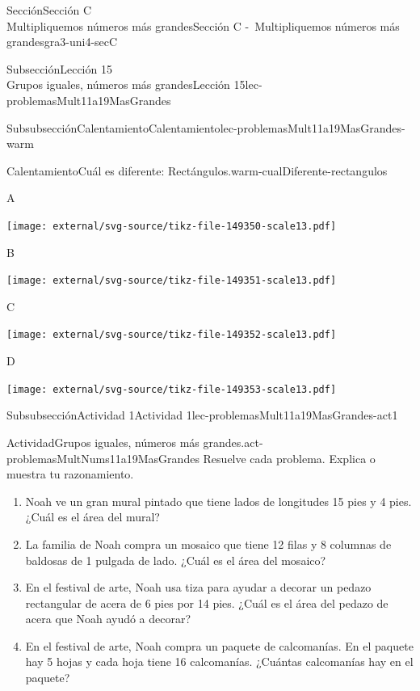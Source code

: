 \begin{sectionptx}{Sección}{{\Large Sección C\\}Multipliquemos números más grandes}{}{Sección C -~Multipliquemos números más grandes}{}{}{gra3-uni4-secC}
\begin{subsectionptx}{Subsección}{{\normalsize Lección 15\\[-0.05cm]}Grupos iguales, números más grandes}{}{Lección 15}{}{}{lec-problemasMult11a19MasGrandes}
\begin{subsubsectionptx}{Subsubsección}{Calentamiento}{}{Calentamiento}{}{}{lec-problemasMult11a19MasGrandes-warm}
\begin{exploration}{Calentamiento}{Cuál es diferente: Rectángulos.}{warm-cualDiferente-rectangulos}
\begin{sidebyside}{2}{0}{0}{0}
\begin{sbspanel}{0.5}
A%
\par
\texttt{[image: external/svg-source/tikz-file-149350-scale13.pdf]}
\end{sbspanel}%
\begin{sbspanel}{0.5}%
B%
\par
\texttt{[image: external/svg-source/tikz-file-149351-scale13.pdf]}
\end{sbspanel}%
\end{sidebyside}%
\begin{sidebyside}{2}{0}{0}{0}%
\begin{sbspanel}{0.5}%
C%
\par
\texttt{[image: external/svg-source/tikz-file-149352-scale13.pdf]}
\end{sbspanel}%
\begin{sbspanel}{0.5}%
D%
\par
\texttt{[image: external/svg-source/tikz-file-149353-scale13.pdf]}
\end{sbspanel}%
\end{sidebyside}%
\end{exploration}%
\end{subsubsectionptx}
%
%
\typeout{************************************************}
\typeout{************************************************}
%
\begin{subsubsectionptx}{Subsubsección}{Actividad 1}{}{Actividad 1}{}{}{lec-problemasMult11a19MasGrandes-act1}
\begin{activity}{Actividad}{Grupos iguales, números más grandes.}{act-problemasMultNums11a19MasGrandes}%
Resuelve cada problema. Explica o muestra tu razonamiento.%
%
\begin{enumerate}
\item{}Noah ve un gran mural pintado que tiene lados de longitudes 15 pies y 4 pies. ¿Cuál es el área del mural?%
\item{}La familia de Noah compra un mosaico que tiene 12 filas y 8 columnas de baldosas de 1 pulgada de lado. ¿Cuál es el área del mosaico?%
\item{}En el festival de arte, Noah usa tiza para ayudar a decorar un pedazo rectangular de acera de 6 pies por 14 pies. ¿Cuál es el área del pedazo de acera que Noah ayudó a decorar?%
\item{}En el festival de arte, Noah compra un paquete de calcomanías. En el paquete hay 5 hojas y cada hoja tiene 16 calcomanías. ¿Cuántas calcomanías hay en el paquete?%
\end{enumerate}
\end{activity}%

\end{subsubsectionptx}
\end{subsectionptx}
\end{sectionptx}
